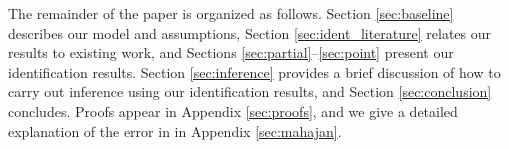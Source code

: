 The remainder of the paper is organized as follows.
Section \ref{sec:baseline} describes our model and assumptions, Section \ref{sec:ident_literature} relates our results to existing work, and Sections \ref{sec:partial}--\ref{sec:point} present our identification results.
Section \ref{sec:inference} provides a brief discussion of how to carry out inference using our identification results, and Section \ref{sec:conclusion} concludes.
Proofs appear in Appendix \ref{sec:proofs}, and we give a detailed explanation of the error in \cite{Mahajan} in Appendix \ref{sec:mahajan}.


